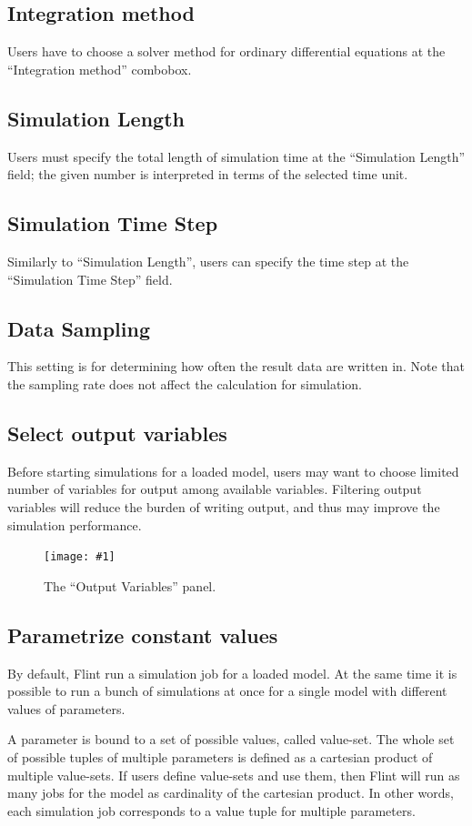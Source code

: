 \documentclass[a4paper,10pt]{report}
\newcommand\FigureOfImage[2]{\begin{figure}[h]
  \centering
  \texttt{[image: \#1]}
  \caption{#2}\label{fig:#1}
\end{figure}}
\begin{document}
\subsection{Integration method}
Users have to choose a solver method for ordinary differential equations at the
``Integration method'' combobox.

\subsection{Simulation Length}
Users must specify the total length of simulation time at the ``Simulation Length''
field; the given number is interpreted in terms of the selected time unit.

\subsection{Simulation Time Step}
Similarly to ``Simulation Length'', users can specify the time step at the
``Simulation Time Step'' field.

\subsection{Data Sampling}
This setting is for determining how often the result data are written in.
Note that the sampling rate does not affect the calculation for simulation.

\subsection{Select output variables}
Before starting simulations for a loaded model, users may want to choose limited
number of variables for output among available variables. Filtering output
variables will reduce the burden of writing output, and thus may improve the
simulation performance.
\FigureOfImage{lr-output-variables}{The ``Output Variables'' panel.}

\subsection{Parametrize constant values}
By default, Flint run a simulation job for a loaded model. At the same time
it is possible to run a bunch of simulations at once for a single model with
different values of parameters.

A parameter is bound to a set of possible values, called value-set.
The whole set of possible tuples of multiple parameters is defined as a
cartesian product of multiple value-sets.
If users define value-sets and use them, then Flint will run as many jobs
for the model as cardinality of the cartesian product. In other words,
each simulation job corresponds to a value tuple for multiple parameters.
\end{document}
